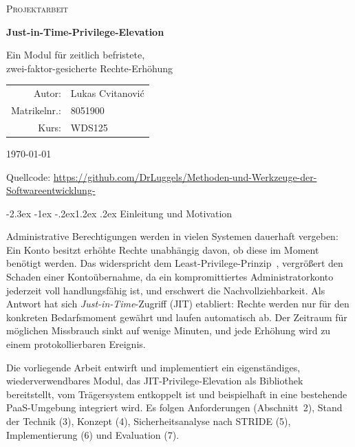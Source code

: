 \documentclass[11pt,a4paper]{article}
\makeatletter
\renewcommand\section{\@startsection{section}{1}{\z@}%
  {-2.3ex \@plus -1ex \@minus -.2ex}{1.2ex \@plus .2ex}%
  {\normalfont\Large\bfseries}}
\makeatother
\begin{document}
\begin{titlepage}
  \centering
  {\scshape Projektarbeit\par}
  \vfill
  {\Huge\bfseries Just-in-Time-Privilege-Elevation\par}
  \vspace{0.8cm}
  {\Large Ein Modul für zeitlich befristete,\\[0.2em]
   zwei-faktor-gesicherte Rechte-Erhöhung\par}
  \vfill
  \begin{tabular}{rl}
    Autor:        & Lukas Cvitanović \\
    Matrikelnr.:  & 8051900 \\
    Kurs:         & WDS125 \\
  \end{tabular}
  \vspace{1.5cm}

  {\large \today\par}
  \vspace{0.6cm}
  {\small Quellcode:
   \url{https://github.com/DrLuggels/Methoden-und-Werkzeuge-der-Softwareentwicklung-}\par}
\end{titlepage}

\tableofcontents
\clearpage

\section{Einleitung und Motivation}

Administrative Berechtigungen werden in vielen Systemen dauerhaft vergeben:
Ein Konto besitzt erhöhte Rechte unabhängig davon, ob diese im Moment benötigt
werden. Das widerspricht dem Least-Privilege-Prinzip~\cite{owasp_polp}, vergrößert
den Schaden einer Kontoübernahme, da ein kompromittiertes Administratorkonto jederzeit
voll handlungsfähig ist, und erschwert die Nachvollziehbarkeit. Als Antwort hat
sich \emph{Just-in-Time}-Zugriff (JIT) etabliert: Rechte werden nur für den
konkreten Bedarfsmoment gewährt und laufen automatisch ab. Der Zeitraum für
möglichen Missbrauch sinkt auf wenige Minuten, und jede Erhöhung wird zu einem
protokollierbaren Ereignis.

Die vorliegende Arbeit entwirft und implementiert ein eigenständiges,
wiederverwendbares Modul, das JIT-Privilege-Elevation als Bibliothek
bereitstellt, vom Trägersystem entkoppelt ist und beispielhaft in eine
bestehende PaaS-Umgebung integriert wird. Es folgen Anforderungen
(Abschnitt~2), Stand der Technik (3), Konzept (4), Sicherheitsanalyse nach
STRIDE (5), Implementierung (6) und Evaluation (7).
\end{document}
